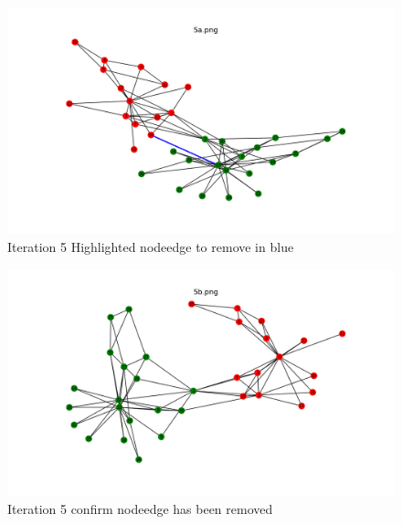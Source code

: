 \documentclass[12pt]{article}
\begin{document}
\begin{figure}[H]
\centering
\includegraphics[trim=0 0 0 0, clip, width=\textwidth] {5a.png}
\caption{Iteration 5 Highlighted nodeedge to remove in blue }
\label{fig:q15a}
\end{figure}
\begin{figure}[H]
\centering
\includegraphics[trim=0 0 0 0, clip, width=\textwidth] {5b.png}
\caption{Iteration 5 confirm nodeedge has been removed }
\label{fig:q15b}
\end{figure}
\end{document}
